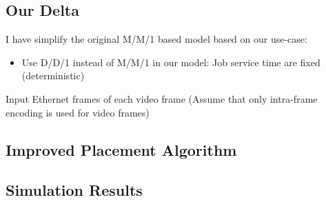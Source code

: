 \documentclass[12pt]{article}
\begin{document}
\subsection{Our Delta}%
\label{sub:our_delta}

I have simplify the original M/M/1 based model based on our use-case:

\begin{itemize}
    \item Use D/D/1 instead of M/M/1 in our model: Job service time are fixed (deterministic)
\end{itemize}

Input Ethernet frames of each video frame (Assume that only intra-frame encoding is used for video frames)

\subsection{Improved Placement Algorithm}%
\label{sub:improved_placement_algorithm}

\subsection{Simulation Results}%
\label{sub:simulation_results}

\medskip
\printbibliography
\end{document}
